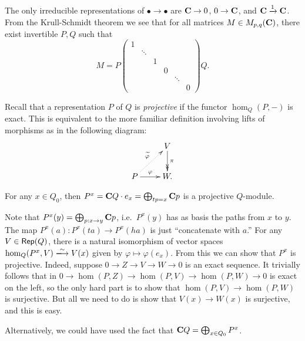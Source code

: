 \documentclass{article}
\begin{document}
\begin{example}
The only irreducible representations of $\bullet \to \bullet$ are 
$\mathbf{C} \to 0$, $0 \to \mathbf{C}$, and $\mathbf{C} \xrightarrow 1 \mathbf{C}$. From the Krull-Schmidt 
theorem we see that for all matrices $M\in M_{p,q}(\mathbf{C})$, there exist 
invertible $P,Q$ such that 
\[
  M = P 
  \begin{pmatrix} 
    1 \\
    & \ddots \\
    & & 1 \\
    & & & 0 \\
    & & & & \ddots \\
    & & & & & 0
  \end{pmatrix} Q .
\]
\end{example}



Recall that a representation $P$ of $Q$ is \emph{projective} if the functor 
$\hom_Q(P,-)$ is exact. This is equivalent to the more familiar definition 
involving lifts of morphisms as in the following diagram:
\[\xymatrix{
  & V \ar@{->>}[d]^-\pi \\
  P \ar[r]^-\varphi \ar@{.>}[ur]^-{\widetilde\varphi}
    & W .
}\]

\begin{example}
For any $x\in Q_0$, then $P^x = \mathbf{C} Q\cdot e_x = \bigoplus_{t p=x} \mathbf{C} p$ is a 
projective $Q$-module. 
\end{example}

Note that $P^x(y) = \bigoplus_{p:x\to y} \mathbf{C} p$, i.e.\ $P^x(y)$ has as basis 
the paths from $x$ to $y$. The map $P^x(a):P^x(t a) \to P^x(h a)$ is just 
``concatenate with $a$.'' For any 
$V\in \operatorname{\mathsf{Rep}}(Q)$, there is a natural isomorphism of vector spaces 
$\hom_Q(P^x,V)\isomorphism V(x)$ given by $\varphi\mapsto \varphi(e_x)$. From 
this we can show that $P^x$ is projective. Indeed, suppose 
$0 \to Z \to V \to W \to 0$ is an exact sequence. It trivially follows that 
in $0 \to \hom(P,Z) \to \hom(P,V) \to \hom(P,W) \to 0$ is exact on the 
left, so the only hard part is to show that 
$\hom(P,V) \to \hom(P,W)$ is surjective. But all we need to do is show that 
$V(x) \to W(x)$ is surjective, and this is easy. 

Alternatively, we could have used the fact that 
$\mathbf{C} Q=\bigoplus_{x\in Q_0} P^x$. 
\end{document}
